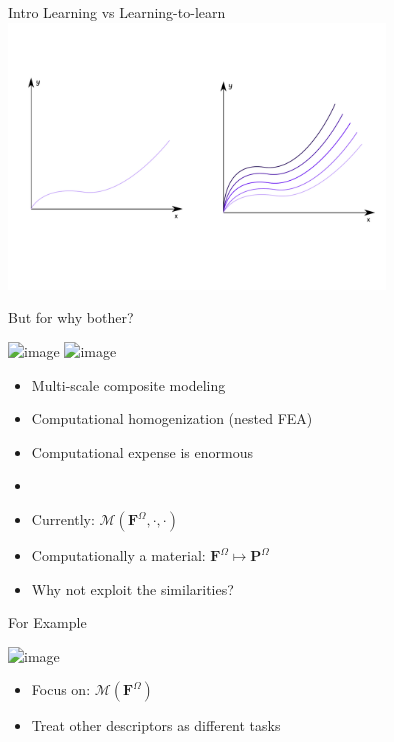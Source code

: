 \documentclass[aspectratio=169]{beamer}
\begin{document}
\begin{frame}{Intro}
  \centering
  Learning vs Learning-to-learn
  \includegraphics[width=0.75\textwidth]{singlevsmeta}
\end{frame}

\begin{frame}{But for why bother?}
\begin{minipage}{0.5\textwidth}
  \includegraphics<1>[width=\textwidth]{FE2}
  \includegraphics<2>[width=\textwidth]{FE2-ML}
\end{minipage}%
\begin{minipage}{0.5\textwidth}
  \begin{itemize}
    \item<1> Multi-scale composite modeling
    \item<1> Computational homogenization (nested FEA)
    \item<1> Computational expense is enormous

    \item<1-2>\dotfill

    \item<2> Currently: $\mathcal{M}(\mathbf{F}^\Omega,\cdot,\cdot)$
    \item<2> Computationally a material: $\mathbf{F}^\Omega\mapsto\mathbf{P}^\Omega$
    \item<2> Why not exploit the similarities?
  \end{itemize}
\end{minipage}
\end{frame}

\begin{frame}{For Example}
\begin{minipage}{0.5\textwidth}
  \includegraphics<1>[width=\textwidth]{example}
\end{minipage}%
\begin{minipage}{0.5\textwidth}
  \begin{itemize}
    \item<1> Focus on: $\mathcal{M}(\mathbf{F}^\Omega)$
    \item<1> Treat other descriptors as different tasks
  \end{itemize}
\end{minipage}
\end{frame}
\end{document}
